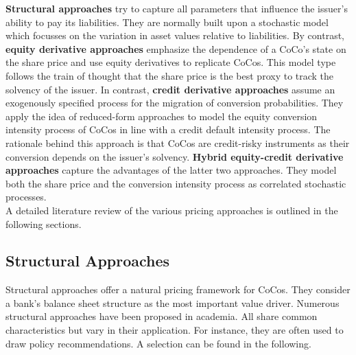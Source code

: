 \textbf{Structural approaches} try to capture all parameters that influence the issuer's ability to pay its liabilities. They are normally built upon a stochastic model which focusses on the variation in asset values relative to liabilities. \citep{duffie2003credit} By contrast, \textbf{equity derivative approaches} emphasize the dependence of a CoCo's state on the share price and use equity derivatives to replicate CoCos. This model type follows the train of thought that the share price is the best proxy to track the solvency of the issuer. In contrast, \textbf{credit derivative approaches} assume an exogenously specified process for the migration of conversion probabilities. They apply the idea of reduced-form approaches to model the equity conversion intensity process of CoCos in line with a credit default intensity process. The rationale behind this approach is that CoCos are credit-risky instruments as their conversion depends on the issuer's solvency. \citep{wilkens2014contingent} \textbf{Hybrid equity-credit derivative approaches} capture the advantages of the latter two approaches. They model both the share price and the conversion intensity process as correlated stochastic processes. \citep{turfus2015cocos}\\ 

A detailed literature review of the various pricing approaches is outlined in the following sections.

\subsection*{Structural Approaches}
Structural approaches offer a natural pricing framework for CoCos. They consider a bank's balance sheet structure as the most important value driver. Numerous structural approaches have been proposed in academia. All share common characteristics but vary in their application. \citep{wilkens2014contingent} For instance, they are often used to draw policy recommendations. A selection can be found in the following.\\ 

